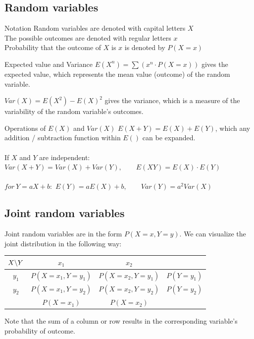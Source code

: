 \documentclass{article}
\begin{document}
\subsection{Random variables}
\begin{knBox}[]{Notation}
    Random variables are denoted with capital letters $X$\\
    The possible outcomes are denoted with regular letters $x$\\
    Probability that the outcome of $X$ is $x$ is denoted by $P(X=x)$
\end{knBox}
\begin{propBox}[]{Expected value and Variance}
    $E(X^n)=\sum(x^n\cdot P(X=x))$ gives the expected value, which represents the mean value (outcome) of the random variable.

    $Var(X)=E(X^2)-E(X)^2$ gives the variance, which is a measure of the variability of the random variable's outcomes.
\end{propBox}
\begin{propBox}[]{Operations of $E(X)$ and $Var(X)$}
    $E(X+Y)=E(X)+E(Y)$, which any addition / subtraction function within $E()$ can be expanded.\\
    \\
    If $X$ and $Y$ are independent:
    $Var(X+Y) = Var(X) + Var(Y),\quad\quad E(XY)    = E(X)\cdot E(Y)$\\
    \\
    $for\ Y=aX+b:$ $E(Y)=aE(X)+b,\quad\quad Var(Y)=a^2Var(X)$

\end{propBox}

\subsection{Joint random variables}
Joint random variables are in the form $P(X=x, Y=y)$. We can visualize the joint distribution in the following way:
\begin{center}
    \begin{table}[H]
        \begin{tabular}{|c|c|c|c|}
            \hline
            $X \symbol{92}Y$ & $x_1$ & $x_2$ & \\
            \hline
            $y_1$ & $P(X=x_1, Y=y_1)$ & $P(X=x_2, Y=y_1)$ & $P(Y=y_1)$\\
            \hline
            $y_2$ & $P(X=x_1, Y=y_2)$ & $P(X=x_2, Y=y_2)$ & $P(Y=y_2)$\\
            \hline
             & $P(X=x_1)$ & $P(X=x_2)$ & \\
            \hline
        \end{tabular}
    \end{table}
    \vspace{-1cm}
\end{center}
Note that the sum of a column or row results in the corresponding variable's probability of outcome.
\end{document}
